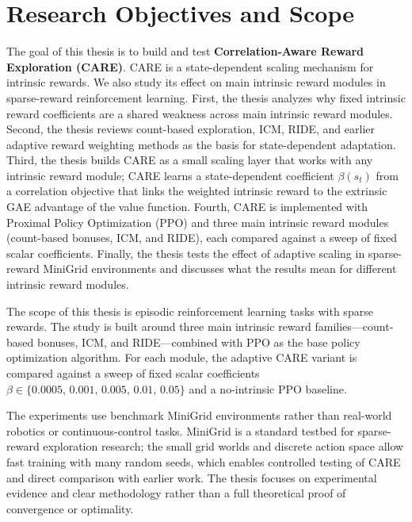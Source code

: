 \section{Research Objectives and Scope}
The goal of this thesis is to build and test \textbf{Correlation-Aware Reward Exploration (CARE)}. CARE is a state-dependent scaling mechanism for intrinsic rewards. We also study its effect on main intrinsic reward modules in sparse-reward reinforcement learning. First, the thesis analyzes why fixed intrinsic reward coefficients are a shared weakness across main intrinsic reward modules. Second, the thesis reviews count-based exploration, ICM, RIDE, and earlier adaptive reward weighting methods as the basis for state-dependent adaptation. Third, the thesis builds CARE as a small scaling layer that works with any intrinsic reward module; CARE learns a state-dependent coefficient $\beta(s_t)$ from a correlation objective that links the weighted intrinsic reward to the extrinsic GAE advantage of the value function. Fourth, CARE is implemented with Proximal Policy Optimization (PPO) and three main intrinsic reward modules (count-based bonuses, ICM, and RIDE), each compared against a sweep of fixed scalar coefficients. Finally, the thesis tests the effect of adaptive scaling in sparse-reward MiniGrid environments and discusses what the results mean for different intrinsic reward modules.

The scope of this thesis is episodic reinforcement learning tasks with sparse rewards. The study is built around three main intrinsic reward families---count-based bonuses, ICM, and RIDE---combined with PPO as the base policy optimization algorithm. For each module, the adaptive CARE variant is compared against a sweep of fixed scalar coefficients $\beta \in \{0.0005,\, 0.001,\, 0.005,\, 0.01,\, 0.05\}$ and a no-intrinsic PPO baseline.

The experiments use benchmark MiniGrid environments \cite{chevalier2018minigrid} rather than real-world robotics or continuous-control tasks. MiniGrid is a standard testbed for sparse-reward exploration research; the small grid worlds and discrete action space allow fast training with many random seeds, which enables controlled testing of CARE and direct comparison with earlier work. The thesis focuses on experimental evidence and clear methodology rather than a full theoretical proof of convergence or optimality.


